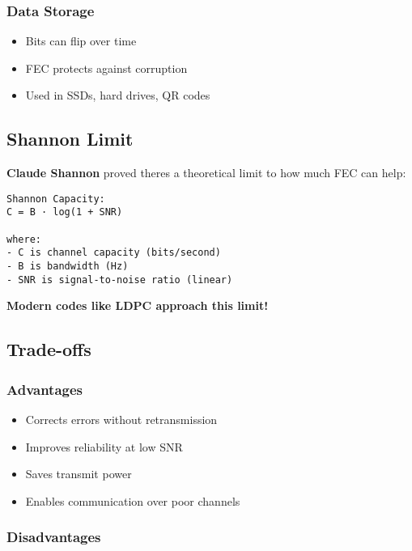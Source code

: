 \subsubsection{Data Storage}\label{data-storage}

\begin{itemize}
\tightlist
\item
  Bits can flip over time
\item
  FEC protects against corruption
\item
  Used in SSDs, hard drives, QR codes
\end{itemize}

\subsection{Shannon Limit}\label{shannon-limit}

\textbf{Claude Shannon} proved there\textquotesingle s a theoretical
limit to how much FEC can help:

\begin{verbatim}
Shannon Capacity:
C = B · log(1 + SNR)

where:
- C is channel capacity (bits/second)
- B is bandwidth (Hz)
- SNR is signal-to-noise ratio (linear)
\end{verbatim}

\textbf{Modern codes like LDPC approach this limit!}

\subsection{Trade-offs}\label{trade-offs}

\subsubsection{Advantages}\label{advantages}

\begin{itemize}
\tightlist
\item
  Corrects errors without retransmission
\item
  Improves reliability at low SNR
\item
  Saves transmit power
\item
  Enables communication over poor channels
\end{itemize}

\subsubsection{Disadvantages}\label{disadvantages}

